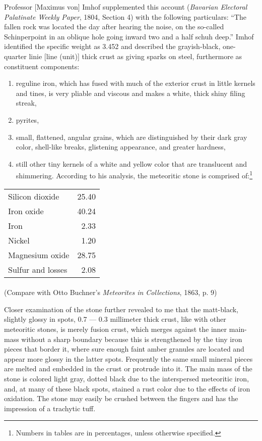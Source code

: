 \documentclass[a4paper, 12pt, oneside]{article}
\begin{document}
Professor [Maximus von] Imhof supplemented this account (\emph{Bavarian Electoral Palatinate Weekly Paper}, 1804, Section 4) with the following particulars: ``The fallen rock was located the day after hearing the noise, on the so-called Schinperpoint in an oblique hole going inward two and a half schuh deep.'' Imhof identified the specific weight as 3.452 and described the grayish-black, one-quarter linie [line (unit)] thick crust as giving sparks on steel, furthermore as constituent components:
\begin{enumerate}
    \item reguline iron, which has fused with much of the exterior crust in little kernels and tines, is very pliable and viscous and makes a white, thick shiny filing streak,
    \item pyrites,
    \item small, flattened, angular grains, which are distinguished by their dark gray color, shell-like breaks, glistening appearance, and greater hardness,
    \item still other tiny kernels of a white and yellow color that are translucent and shimmering. According to his analysis, the meteoritic stone is comprised of:\footnote{Numbers in tables are in percentages, unless otherwise specified.}
\end{enumerate}
\begin{center}
    \begin{tabular}{l r} 
    Silicon dioxide & 25.40\\
    Iron oxide & 40.24\\
    Iron & 2.33\\
    Nickel & 1.20\\
    Magnesium oxide & 28.75\\
    Sulfur and losses & 2.08\\
    \end{tabular}
\end{center}
\paragraph*{}
(Compare with Otto Buchner's \emph{Meteorites in Collections}, 1863, p. 9)

Closer examination of the stone further revealed to me that the matt-black, slightly glossy in spots, 0.7 --- 0.3 millimeter thick crust, like with other meteoritic stones, is merely fusion crust, which merges against the inner main-mass without a sharp boundary because this is strengthened by the tiny iron pieces that border it, where sure enough faint amber granules are located and appear more glossy in the latter spots. Frequently the same small mineral pieces are melted and embedded in the crust or protrude into it. The main mass of the stone is colored light gray, dotted black due to the interspersed meteoritic iron, and, at many of these black spots, stained a rust color due to the effects of iron oxidation. The stone may easily be crushed between the fingers and has the impression of a trachytic tuff.
\end{document}
